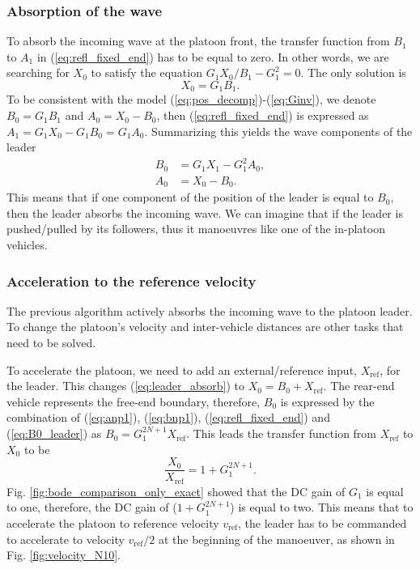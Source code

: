 \documentclass[final,5p,times,twocolumn]{elsarticle}
\begin{document}
\subsubsection{Absorption of the wave}
\label{subsec:wave_absorption}

To absorb the incoming wave at the platoon front, the transfer function from $B_1$ to $A_1$ in (\ref{eq:refl_fixed_end}) has to be equal to zero. In other words, we are searching for $X_0$ to satisfy the equation $G_1 X_0/B_1 - G_1^2 = 0$. The only solution is
\begin{equation}
  X_0 = G_1B_1.
  \label{eq:leader_absorb}
\end{equation}
To be consistent with the model (\ref{eq:pos_decomp})-(\ref{eq:Ginv}), we denote $B_0 = G_1B_1$ and $A_0 = X_0-B_0$, then (\ref{eq:refl_fixed_end}) is expressed as $A_1 = G_1X_0-G_1B_0 = G_1 A_0$. Summarizing this yields the wave components of the leader
\begin{align}
  B_0 &= G_1X_1-G_1^2A_0, \label{eq:B0_leader}\\
  A_0 &= X_0-B_0.
\end{align}
This means that if one component of the position of the leader is equal to $B_0$, then the leader absorbs the incoming wave. We can imagine that if the leader is pushed/pulled by its followers, thus it manoeuvres like one of the in-platoon vehicles.

\subsubsection{Acceleration to the reference velocity}
\label{subsec:acceleration_platoon}

The previous algorithm actively absorbs the incoming wave to the platoon leader. To change the platoon's velocity and inter-vehicle distances are other tasks that need to be solved.

To accelerate the platoon, we need to add an external/reference input, $X_{\text{ref}}$, for the leader. This changes (\ref{eq:leader_absorb}) to $X_0 = B_0+X_{\text{ref}}$. The rear-end vehicle represents the free-end boundary, therefore, $B_0$ is expressed by the combination of (\ref{eq:anp1}), (\ref{eq:bnp1}), (\ref{eq:refl_fixed_end}) and (\ref{eq:B0_leader}) as $B_0 = G_1^{2N+1}X_{\text{ref}}$. This leads the transfer function from $X_{\text{ref}}$ to $X_0$ to be
\begin{equation}
  \frac{X_{\text{0}}}{X_{\text{ref}}} = 1+G_1^{2N+1}.
  \label{eq:leader_accel_trans}
\end{equation}
Fig. \ref{fig:bode_comparison_only_exact} showed that the DC gain of $G_1$ is equal to one, therefore, the DC gain of ($1+G_1^{2N+1}$) is equal to two. This means that to accelerate the platoon to reference velocity $v_{\text{ref}}$, the leader has to be commanded to accelerate to velocity $v_{\text{ref}}/2$ at the beginning of the manoeuver, as shown in Fig. \ref{fig:velocity_N10}.
\end{document}
